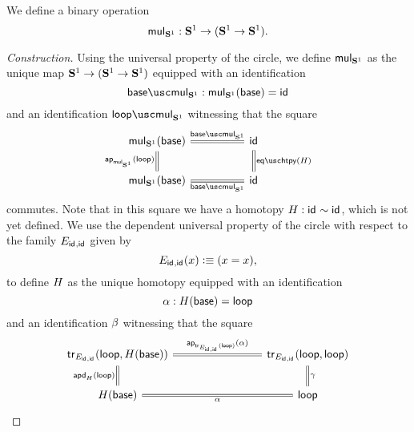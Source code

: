 \begin{defn}\label{defn:mul-circle}
  We define a binary operation
\begin{equation*}
  \mathsf{mul}_{\mathbf{S}^{1}} : \mathbf{S}^{1}\to(\mathbf{S}^{1}\to\mathbf{S}^{1}).
\end{equation*}
\end{defn}

\begin{proof}[Construction]
  Using the universal property of the circle, we define $\mathsf{mul}_{\mathbf{S}^{1}}$ as the unique map $\mathbf{S}^{1}\to(\mathbf{S}^{1}\to\mathbf{S}^{1})$ equipped with an identification
  \begin{equation*}
    \basemulcircle :\mulcircle(\base)=\idfunc
  \end{equation*}
  and an identification $\loopmulcircle$ witnessing that the square
  \begin{equation*}
    \begin{tikzcd}[column sep=huge]
      \mulcircle(\base) \arrow[r,equals,"\basemulcircle"] \arrow[d,equals,swap,"\ap{\mulcircle}{\lloop}"] & \idfunc \arrow[d,equals,"\eqhtpy(\htpyidcircle)"] \\
      \mulcircle(\base) \arrow[r,equals,swap,"\basemulcircle"] & \idfunc
  \end{tikzcd}
  \end{equation*}
  commutes. Note that in this square we have a homotopy $H:\mathsf{id}_{}\sim\mathsf{id}_{}$, which is not yet defined. We  use the dependent universal property of the circle with respect to the family $E_{\mathsf{id}_{},\mathsf{id}_{}}$ given by
  \begin{equation*}
    E_{\mathsf{id}_{},\mathsf{id}_{}}(x) \vcentcolon\equiv (x=x),
  \end{equation*}
  to define $H$ as the unique homotopy equipped with an identification
  \begin{equation*}
    \alpha : H(\mathsf{base})=\mathsf{loop}
  \end{equation*}
  and an identification $\beta$ witnessing that the square
  \begin{equation*}
    \begin{tikzcd}[column sep=8em]
      \tr_{E_{\idfunc,\idfunc}}(\lloop,\htpyidcircle(\base)) \arrow[r,equals,"\ap{\tr_{E_{\idfunc,\idfunc}}(\lloop)}{\basehtpyidcircle}"] \arrow[d,equals,swap,"\apd{\htpyidcircle}{\lloop}"] & \tr_{E_{\idfunc,\idfunc}}(\lloop,\lloop) \arrow[d,equals,"\gamma"] \\
      \htpyidcircle(\base) \arrow[r,equals,swap,"\basehtpyidcircle"] & \lloop
    \end{tikzcd}

\end{equation*}
\end{proof}

